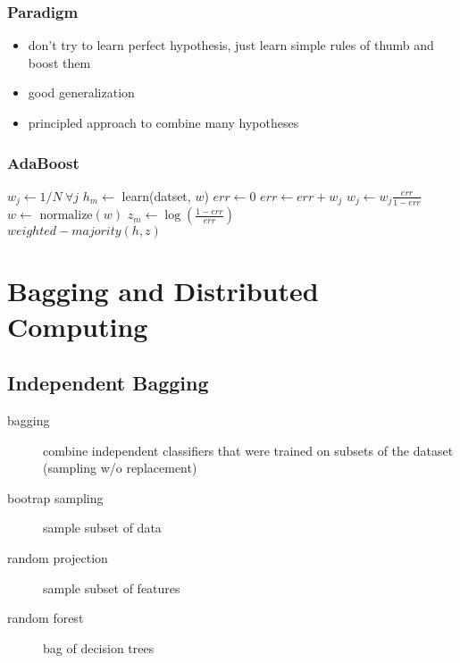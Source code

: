\documentclass[]{article}
\theoremstyle{definition}
\begin{document}
\subsubsection{Paradigm}
\label{ssub:Paradigm}

\begin{itemize}
    \item don't try to learn perfect hypothesis, just learn simple rules of thumb and boost them
    \item good generalization
    \item principled approach to combine many hypotheses
\end{itemize}

\subsubsection{AdaBoost}
\label{ssub:AdaBoost}

\begin{algorithmic}
    \State $w_j \gets 1/N \ \forall j $
    \State $h_m \gets$ learn(datset, $w$)
    \State $err \gets 0$
    \State $err \gets err +w_j$
    \EndIf
    \EndFor
    \State $w_j \gets w_j \frac{err}{1-err}$
    \EndIf
    \EndFor
    \State $w \gets \text{ normalize}(w)$
    \State $z_m \gets \log (\frac{1-err}{err})$
    \EndFor \\
    \Return $weighted-majority(h,z)$
\end{algorithmic}

\section{Bagging and Distributed Computing}
\label{sec:bagging_and_distributed_computing}

\subsection{Independent Bagging}
\label{sub:independengt_bagging}
\begin{description}
    \item[bagging] combine independent classifiers that were trained on subsets of the dataset (sampling w/o replacement)
    \item[bootrap sampling] sample subset of data
    \item[random projection] sample subset of features
    \item[random forest] bag of decision trees
\end{description}
\end{document}
